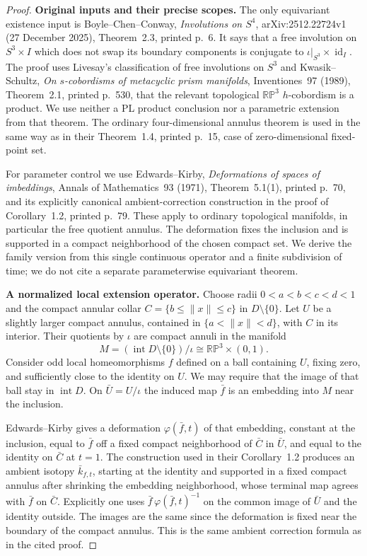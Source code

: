 \begin{proof}
\textbf{Original inputs and their precise scopes.}\quad
The only equivariant existence input is Boyle--Chen--Conway,
\emph{Involutions on $S^4$}, arXiv:2512.22724v1 (27 December 2025),
Theorem~2.3, printed p.~6. It says that a free involution on $S^3\times I$
which does not swap its boundary components is conjugate to
$\iota|_{S^3}\times\operatorname{id}_I$. The proof uses Livesay's
classification of free involutions on $S^3$ and Kwasik--Schultz,
\emph{On $s$-cobordisms of metacyclic prism manifolds}, Inventiones~97
(1989), Theorem~2.1, printed p.~530, that the relevant topological
$\mathbb {RP}^3$ $h$-cobordism is a product. We use neither a PL product
conclusion nor a parametric extension from that theorem. The ordinary
four-dimensional annulus theorem is used in the same way as in their
Theorem~1.4, printed p.~15, case of zero-dimensional fixed-point set.

For parameter control we use Edwards--Kirby, \emph{Deformations of spaces
of imbeddings}, Annals of Mathematics~93 (1971), Theorem~5.1(1), printed
p.~70, and its explicitly canonical ambient-correction construction in the
proof of Corollary~1.2, printed p.~79. These apply to ordinary topological
manifolds, in particular the free quotient annulus. The deformation fixes
the inclusion and is supported in a compact neighborhood of the chosen
compact set. We derive the family version from this single continuous
operator and a finite subdivision of time; we do not cite a separate
parameterwise equivariant theorem.

\textbf{A normalized local extension operator.}\quad
Choose radii $0<a<b<c<d<1$ and the compact annular collar
$C=\{b\le\|x\|\le c\}$ in $D\setminus\{0\}$. Let $U$ be a slightly
larger compact annulus, contained in $\{a<\|x\|<d\}$, with $C$ in its
interior. Their quotients by $\iota$ are compact annuli in the manifold
\[
 M=(\operatorname{int}D\setminus\{0\})/\iota
       \cong\mathbb {RP}^3\times(0,1).
\]
Consider odd local homeomorphisms $f$ defined on a ball containing $U$,
fixing zero, and sufficiently close to the identity on $U$. We may require
that the image of that ball stay in $\operatorname{int}D$. On $\bar U=U/\iota$
the induced map $\bar f$ is an embedding into $M$ near the inclusion.

Edwards--Kirby gives a deformation $\varphi(\bar f,t)$ of that embedding,
constant at the inclusion, equal to $\bar f$ off a fixed compact
neighborhood of $\bar C$ in $\bar U$, and equal to the identity on
$\bar C$ at $t=1$. The construction used in their Corollary~1.2 produces
an ambient isotopy $\bar k_{f,t}$, starting at the identity and supported
in a fixed compact annulus after shrinking the embedding neighborhood,
whose terminal map agrees with $\bar f$ on $\bar C$.
Explicitly one uses
$\bar f\,\varphi(\bar f,t)^{-1}$ on the common image of $\bar U$ and the
identity outside. The images are the same since the deformation is fixed
near the boundary of the compact annulus. This is the same ambient
correction formula as in the cited proof.


\end{proof}
